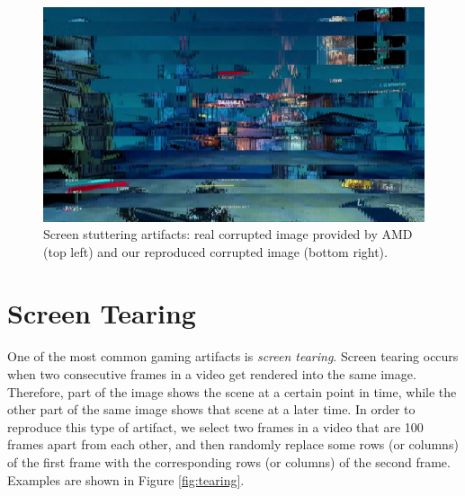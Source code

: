 \begin{figure}[!ht]
\includegraphics[scale=0.11]{images/stutter3.jpg}
\vspace{5pt}
\caption[Screen stuttering artifacts]{Screen stuttering artifacts: real corrupted image provided by AMD (top left) and our reproduced corrupted image (bottom right).}
\label{fig:stuttering}
\end{figure}

\section*{Screen Tearing}
One of the most common gaming artifacts is \textit{screen tearing}. Screen tearing occurs when two consecutive frames in a video get rendered into the same image. Therefore, part of the image shows the scene at a certain point in time, while the other part of the same image shows that scene at a later time. In order to reproduce this type of artifact, we select two frames in a video that are 100 frames apart from each other, and then randomly replace some rows (or columns) of the first frame with the corresponding rows (or columns) of the second frame. Examples are shown in Figure \ref{fig:tearing}.

\newpage

